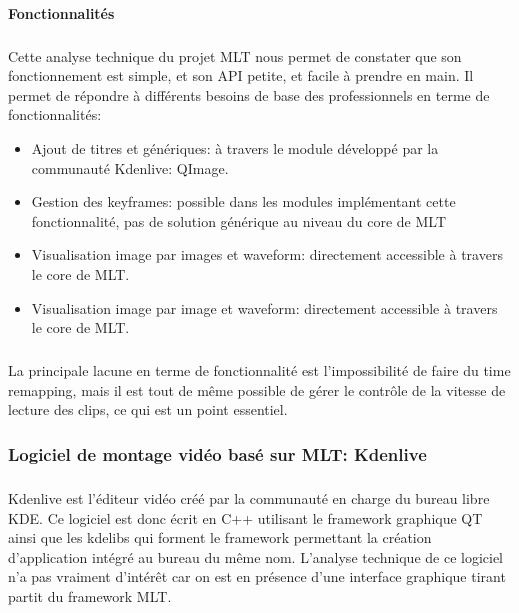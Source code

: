 \paragraph{Fonctionnalités}

\subparagraph{ }

Cette analyse technique du projet MLT nous permet de constater
que son fonctionnement est simple, et son API petite, et facile à
prendre en main.  Il permet de répondre à différents besoins de base
des professionnels en terme de fonctionnalités:

\begin{itemize}

  \item {Ajout de titres et génériques: à travers le module développé
  par la communauté Kdenlive: QImage.}

  \item {Gestion des keyframes: possible dans les modules implémentant
    cette fonctionnalité, pas de solution générique au niveau du core
    de MLT}

  \item {Visualisation image par images et waveform: directement
  accessible à travers le core de MLT.}

  \item {Visualisation image par image et waveform: directement accessible
  à travers le core de MLT.}

\end{itemize}

\subparagraph{}

La principale lacune en terme de fonctionnalité est l'impossibilité de
faire du time remapping, mais il est tout de même possible de gérer
le contrôle de la vitesse de lecture des clips, ce qui est un point
essentiel.

\subsubsection {Logiciel de montage vidéo basé sur MLT:
Kdenlive}

\subparagraph{}

Kdenlive est l'éditeur vidéo créé par la communauté en charge
du bureau libre KDE. Ce logiciel est donc écrit en C++ utilisant le
framework graphique QT  ainsi que les kdelibs qui forment le framework
permettant la création d'application intégré au bureau du même nom.
L'analyse technique de ce logiciel n'a pas vraiment d'intérêt car on
est en présence d'une interface graphique tirant partit du framework
MLT.

